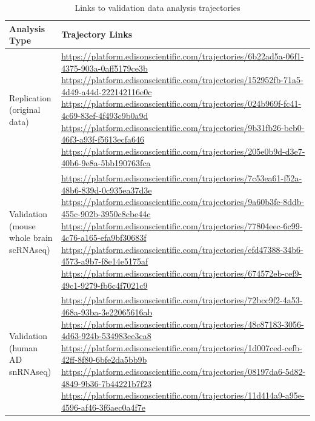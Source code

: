 \documentclass{article}
\begin{document}
\begin{table}[ht]
\centering
\caption{Links to validation data analysis trajectories}
\begin{tabular}{p{} p{}}
\hline
\textbf{Analysis Type} & \textbf{Trajectory Links} \\
\hline
Replication (original data) & 
\url{https://platform.edisonscientific.com/trajectories/6b22ad5a-06f1-4375-903a-0aff5179ce3b} \newline
\url{https://platform.edisonscientific.com/trajectories/152952fb-71a5-4d49-a44d-222142116e0c} \newline
\url{https://platform.edisonscientific.com/trajectories/024b969f-fc41-4c69-83ef-4f493c9b0a9d} \newline
\url{https://platform.edisonscientific.com/trajectories/9b31fb26-beb0-46f3-a93f-f5613ecfa646} \newline
\url{https://platform.edisonscientific.com/trajectories/205e0b9d-d3e7-40b6-9e8a-5bb190763fca} \\
\hline
Validation (mouse whole brain scRNAseq) & 
\url{https://platform.edisonscientific.com/trajectories/7c53ea61-f52a-48b6-839d-0c935ea37d3e} \newline
\url{https://platform.edisonscientific.com/trajectories/9a60b3fe-8ddb-455c-902b-3950c8cbe44c} \newline
\url{https://platform.edisonscientific.com/trajectories/77804eec-6c99-4c76-a165-efa9bf30683f} \newline
\url{https://platform.edisonscientific.com/trajectories/efd47388-34b6-4573-a9b7-f8e14e5175af} \newline
\url{https://platform.edisonscientific.com/trajectories/674572eb-cef9-49c1-9279-fb6c4f7021c9} \\
\hline
Validation (human AD snRNAseq) & 
\url{https://platform.edisonscientific.com/trajectories/72bcc9f2-4a53-468a-93ba-3e22065616ab} \newline
\url{https://platform.edisonscientific.com/trajectories/48c87183-3056-4d63-924b-534983ee3ca8} \newline
\url{https://platform.edisonscientific.com/trajectories/1d007ced-cefb-42ff-8f80-6bfe2da5bb9b} \newline
\url{https://platform.edisonscientific.com/trajectories/08197da6-5d82-4849-9b36-7b44221b7f23} \newline
\url{https://platform.edisonscientific.com/trajectories/11d414a9-a95e-4596-af46-3f6aec0a4f7e} \\
\hline
\end{tabular}
\label{tab:trajectories2}
\end{table}
\end{document}
